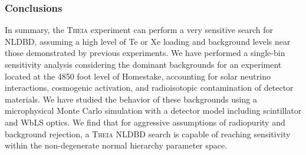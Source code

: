 \subsubsection{Conclusions}
In summary, the \textsc{Theia} experiment can perform a very sensitive search
for NLDBD, assuming a high level of Te or Xe loading and background levels
near those demonstrated by previous experiments. We have performed a
single-bin sensitivity analysis considering the dominant backgrounds for
an experiment located at the 4850 foot level of Homestake, accounting
for solar neutrino interactions, cosmogenic activation, and radioisotopic
contamination of detector materials. We have studied the behavior of these
backgrounds using a microphysical Monte Carlo simulation with a detector
model including scintillator and WbLS optics. We find that for aggressive
assumptions of radiopurity and background rejection, a \textsc{Theia} NLDBD
search is capable of reaching sensitivity within the non-degenerate normal
hierarchy parameter space.

